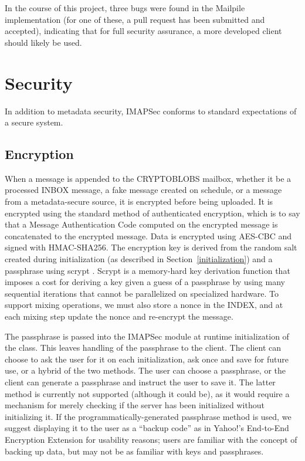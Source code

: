 \documentclass[pageno]{jpaper}
\newcommand{\project}{IMAPSec }
\begin{document}
In the course of this project, three bugs were found in the Mailpile implementation (for one of these, a pull request has been submitted and accepted), indicating that for full security assurance, a more developed client should likely be used.




\section{Security}

In addition to metadata security, \project conforms to standard expectations of a secure system.


\subsection{Encryption}
\label{encryption}

When a message is appended to the CRYPTOBLOBS mailbox, whether it be a processed INBOX message, a fake message created on schedule, or a message from a metadata-secure source, it is encrypted before being uploaded. It is encrypted using the standard method of authenticated encryption, which is to say that a Message Authentication Code computed on the encrypted message is concatenated to the encrypted message. Data is encrypted using AES-CBC and signed with HMAC-SHA256. The encryption key is derived from the random salt created during initialization (as described in Section~\ref{initialization}) and a passphrase using scrypt \cite{percival2009stronger}. Scrypt is a memory-hard key derivation function that imposes a cost for deriving a key given a guess of a passphrase by using many sequential iterations that cannot be parallelized on specialized hardware. To support mixing operations, we must also store a nonce in the INDEX, and at each mixing step update the nonce and re-encrypt the message.

The passphrase is passed into the \project module at runtime initialization of the class. This leaves handling of the passphrase to the client. The client can choose to ask the user for it on each initialization, ask once and save for future use, or a hybrid of the two methods. The user can choose a passphrase, or the client can generate a passphrase and instruct the user to save it. The latter method is currently not supported (although it could be), as it would require a mechanism for merely checking if the server has been initialized without initializing it. If the programmatically-generated passphrase method is used, we suggest displaying it to the user as a ``backup code'' as in Yahoo!'s End-to-End Encryption Extension \cite{yahoo} for usability reasons; users are familiar with the concept of backing up data, but may not be as familiar with keys and passphrases.
\end{document}
